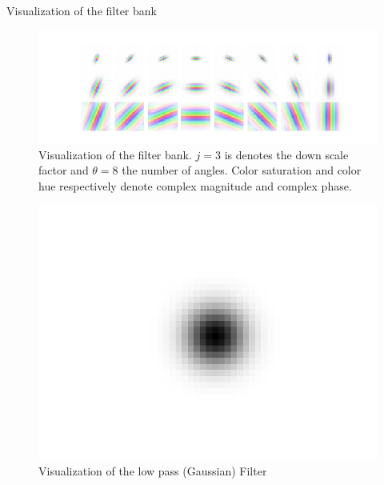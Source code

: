 \documentclass[compress]{beamer}
\begin{document}
	\begin{frame}{Visualization of the filter bank}
		\begin{minipage}[c]{0.67\textwidth}
			\begin{figure}[!htb]
				\centering
				\includegraphics[width=1\textwidth]{images/filter_bank_vis.png}
				\caption{Visualization of the filter bank. $j=3$ is denotes the down scale factor and $\theta=8$ the number of angles. Color saturation and color hue respectively denote complex magnitude and complex phase.}
				\label{fig:viz_filter_bank}
			\end{figure}
		\end{minipage}\hfill
		\begin{minipage}[r]{0.32\textwidth}
			\begin{figure}[!htb]
				\centering
				\includegraphics[width=1.2\textwidth]{images/low_pass_vis.png}
				\caption{Visualization of the low pass (Gaussian) Filter}
				\label{fig:viz_low_pass}
			\end{figure}
		\end{minipage}
	\end{frame}
\end{document}
